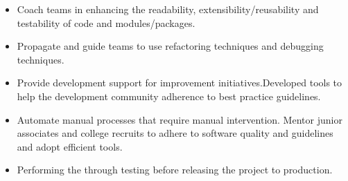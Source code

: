 \documentclass[10pt,A4]{article}
\begin{document}
{\begin{itemize}
Web-site operate at peak efficiency.
\item Coach teams in enhancing the readability, extensibility/reusability and
testability of code and modules/packages.
\item Propagate and guide teams to use refactoring techniques and debugging
techniques.
\item Provide development support for improvement initiatives.Developed tools to help the development community adherence to best practice
guidelines.
\item Automate manual processes that require manual intervention.
Mentor junior associates and college recruits to adhere to software quality and
guidelines and adopt efficient tools.
\item Performing the through testing before releasing the project to production.
\end{itemize}
}
\end{document}
